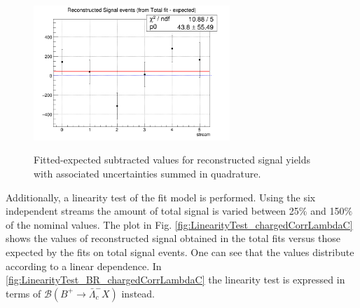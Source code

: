 \begin{figure}[h]
{\includegraphics[width=0.66\textwidth]{04-chargedCorrBtoLambda/figs/RecoSignal_streams_fittedPoints_chargedCorrLambdaC_w_CrossfeedRatio_param.png}}
\caption{Fitted-expected subtracted values for reconstructed signal yields with associated uncertainties summed in quadrature.}
\label{fig:charged_corrLambdaRecoSignal_deviations}
\end{figure}


\noindent Additionally, a linearity test of the fit model is performed. 
Using the six independent streams the  amount of total signal is varied between 25$\%$ and 150$\%$ of the nominal values.%
\noindent  The plot in Fig. \ref{fig:LinearityTest_chargedCorrLambdaC} shows the values of reconstructed signal obtained in the total fits versus those expected by the fits on total signal events. 
One can see that the values distribute according to a linear dependence. In \cref{fig:LinearityTest_BR_chargedCorrLambdaC} the linearity test is expressed in terms of $\mathcal{B}(B^+ \rightarrow \bar{\Lambda}_c^- X)$ instead. %

